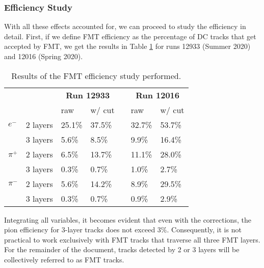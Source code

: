 \subsubsection{Efficiency Study}
\label{14.14::efficiency_study}
    With all these effects accounted for, we can proceed to study the efficiency in detail.
    First, if we define FMT efficiency as the percentage of DC tracks that get accepted by FMT, we get the results in Table \ref{tab::14.14::fmt_efficiency_study} for runs 12933 (Summer 2020) and 12016 (Spring 2020).

    \begin{table}
        \begin{center}
            \begin{tabularx}{0.60\textwidth}{llllcll}
                \toprule
                & & \multicolumn{2}{c}{\textbf{Run 12933}}  & & \multicolumn{2}{c}{\textbf{Run 12016}} \\
                                &          & raw  & w/ cut   & & raw  & w/ cut   \\
                \midrule \midrule
                \textbf{$e^-$}   & 2 layers & 25.1\% & 37.5\% & & 32.7\% & 53.7\% \\
                                 & 3 layers &  5.6\% &  8.5\% & &  9.9\% & 16.4\% \\
                \midrule
                \textbf{$\pi^+$} & 2 layers &  6.5\% & 13.7\% & & 11.1\% & 28.0\% \\
                                 & 3 layers &  0.3\% &  0.7\% & &  1.0\% &  2.7\% \\
                \midrule
                \textbf{$\pi^-$} & 2 layers &  5.6\% & 14.2\% & &  8.9\% & 29.5\% \\
                                 & 3 layers &  0.3\% &  0.7\% & &  0.9\% &  2.9\% \\
                \bottomrule
            \end{tabularx}
        \end{center}
        \caption{Results of the FMT efficiency study performed.}
        \label{tab::14.14::fmt_efficiency_study}
    \end{table}

    Integrating all variables, it becomes evident that even with the corrections, the pion efficiency for 3-layer tracks does not exceed $3\%$.
    Consequently, it is not practical to work exclusively with FMT tracks that traverse all three FMT layers.
    For the remainder of the document, tracks detected by 2 or 3 layers will be collectively referred to as FMT tracks.

